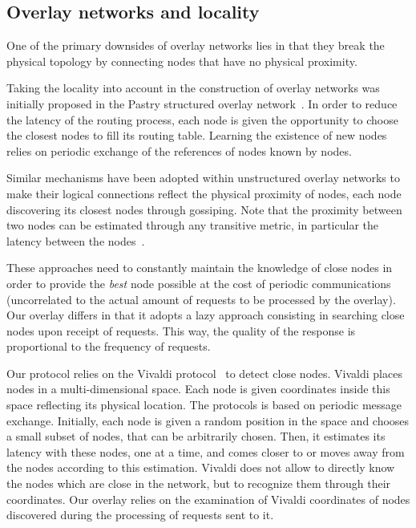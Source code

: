 
\subsection{Overlay networks and locality}

One of the primary downsides of overlay networks lies in that they break the
physical topology by connecting nodes that have no physical proximity.

Taking the locality into account in the construction of overlay networks was
initially proposed in the Pastry structured overlay network~\cite{pastry}. In
order to reduce the latency of the routing process, each node is given the
opportunity to choose the closest nodes to fill its routing table. Learning the
existence of new nodes relies on periodic exchange of the references of nodes
known by nodes.

Similar mechanisms have been adopted within unstructured overlay networks to
make their logical connections reflect the physical proximity of nodes, each
node discovering its closest nodes through gossiping. Note that the proximity
between two nodes can be estimated through any transitive metric, in particular
the latency between the nodes~\cite{refquivabienmarindoittrouver}.

These approaches need to constantly maintain the knowledge of close nodes in
order to provide the \emph{best} node possible at the cost of periodic
communications (uncorrelated to the actual amount of requests to be processed by
the overlay). Our overlay differs in that it adopts a lazy approach consisting
in searching close nodes upon receipt of requests. This way, the quality of the
response is proportional to the frequency of requests. 

Our protocol relies on the Vivaldi protocol~\cite{dabek:2001:sigcomm04} to
detect close nodes. Vivaldi places nodes in a multi-dimensional space. Each node
is given coordinates inside this space reflecting its physical location. The
protocols is based on periodic message exchange. Initially, each node is given a
random position in the space and chooses a small subset of nodes, that can be
arbitrarily chosen. Then, it estimates its latency with these nodes, one at a
time, and comes closer to or moves away from the nodes according to this
estimation. Vivaldi does not allow to directly know the nodes which are close in
the network, but to recognize them through their coordinates. Our overlay relies
on the examination of Vivaldi coordinates of nodes discovered during the
processing of requests sent to it.






